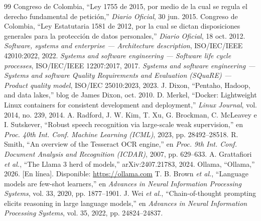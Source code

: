 \documentclass[conference]{IEEEtran}
\begin{document}
\begin{thebibliography}{99}
 Congreso de Colombia, ``Ley 1755 de 2015, por medio de la cual se regula el derecho fundamental de petición,'' \emph{Diario Oficial}, 30 jun. 2015.
 Congreso de Colombia, ``Ley Estatutaria 1581 de 2012, por la cual se dictan disposiciones generales para la protección de datos personales,'' \emph{Diario Oficial}, 18 oct. 2012.
 \emph{Software, systems and enterprise --- Architecture description}, ISO/IEC/IEEE 42010:2022, 2022.
 \emph{Systems and software engineering --- Software life cycle processes}, ISO/IEC/IEEE 12207:2017, 2017.
 \emph{Systems and software engineering --- Systems and software Quality Requirements and Evaluation (SQuaRE) --- Product quality model}, ISO/IEC 25010:2023, 2023.
 J. Dixon, ``Pentaho, Hadoop, and data lakes,'' blog de James Dixon, oct. 2010.
 D. Merkel, ``Docker: Lightweight Linux containers for consistent development and deployment,'' \emph{Linux Journal}, vol. 2014, no. 239, 2014.
 A. Radford, J. W. Kim, T. Xu, G. Brockman, C. McLeavey e I. Sutskever, ``Robust speech recognition via large-scale weak supervision,'' en \emph{Proc. 40th Int. Conf. Machine Learning (ICML)}, 2023, pp. 28492--28518.
 R. Smith, ``An overview of the Tesseract OCR engine,'' en \emph{Proc. 9th Int. Conf. Document Analysis and Recognition (ICDAR)}, 2007, pp. 629--633.
 A. Grattafiori \emph{et al.}, ``The Llama 3 herd of models,'' arXiv:2407.21783, 2024.
 Ollama, ``Ollama,'' 2026. [En línea]. Disponible: \url{https://ollama.com}
 T. B. Brown \emph{et al.}, ``Language models are few-shot learners,'' en \emph{Advances in Neural Information Processing Systems}, vol. 33, 2020, pp. 1877--1901.
 J. Wei \emph{et al.}, ``Chain-of-thought prompting elicits reasoning in large language models,'' en \emph{Advances in Neural Information Processing Systems}, vol. 35, 2022, pp. 24824--24837.
\end{thebibliography}
\end{document}
